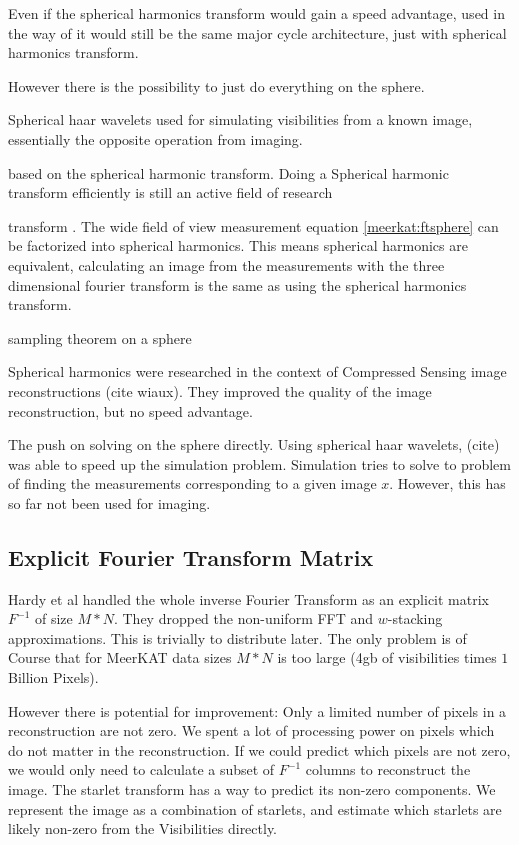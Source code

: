 Even if the spherical harmonics transform would gain a speed advantage, used in the way of \cite{carozzi2015imaging} it would still be the same major cycle architecture, just with spherical harmonics transform.

However there is the possibility to just do everything on the sphere.

Spherical haar wavelets used for simulating visibilities from a known image, essentially the opposite operation from imaging. \cite{mcewen2008simulating}

based on the spherical harmonic transform. Doing a Spherical harmonic transform efficiently is still an active field of research \cite{schaeffer2013efficient}

transform
. The wide field of view measurement equation \eqref{meerkat:ftsphere} can be factorized into spherical harmonics. This means spherical harmonics are equivalent, calculating an image from the measurements with the three dimensional fourier transform is the same as using the spherical harmonics transform. \cite{shaw2014all}

\cite{mcewen2013sparse}sampling theorem on a sphere



Spherical harmonics were researched in the context of Compressed Sensing image reconstructions (cite wiaux). They improved the quality of the image reconstruction, but no speed advantage.

The push on solving on the sphere directly. Using spherical haar wavelets, (cite) was able to speed up the simulation problem. Simulation tries to solve to problem of finding the measurements corresponding to a given image $x$. However, this has so far not been used for imaging.


\subsection{Explicit Fourier Transform Matrix}
Hardy et al\cite{hardy2013direct} handled the whole inverse Fourier Transform as an explicit matrix $F^{-1}$ of size  $M*N$. They dropped the non-uniform FFT and $w$-stacking approximations. This is trivially to distribute later. The only problem is of Course that for MeerKAT data sizes $M*N$ is too large (4gb of visibilities times $1$ Billion Pixels).

However there is potential for improvement: Only a limited number of pixels in a reconstruction are not zero. We spent a lot of processing power on pixels which do not matter in the reconstruction. If we could predict which pixels are not zero, we would only need to calculate a subset of $F^{-1}$ columns to reconstruct the image. The starlet transform\cite{starck2015starlet} has a way to predict its non-zero components. We represent the image as a combination of starlets, and estimate which starlets are likely non-zero from the Visibilities directly.

